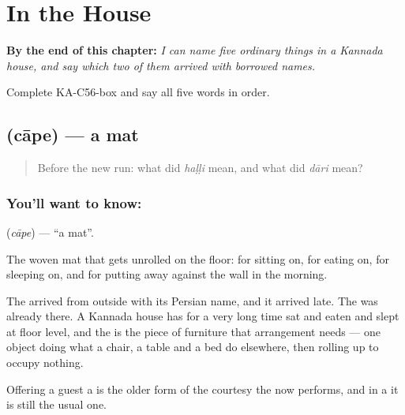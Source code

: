 
\chapter{In the House}
\label{ch:ka-house}

\begin{chapteropening}
\textbf{By the end of this chapter:} \emph{I can name five ordinary things in a Kannada house, and say which two of them arrived with borrowed names.}

Complete KA-C56-box and say all five words in order.
\end{chapteropening}

\section[\texorpdfstring{\kn{ಚಾಪೆ} (cāpe)}{ಚಾಪೆ (cāpe)}]{ (cāpe) — a mat}

\label{lesson:KA-C56-mat}



\begin{quote}
Before the new run: what did \emph{haḷḷi} mean, and what did \emph{dāri} mean?
\end{quote}

\subsection*{You'll want to know: }
\textbf{} (\emph{cāpe}) — \textquotedblleft{}a mat\textquotedblright{}.

The woven mat that gets unrolled on the floor: for sitting on, for eating on, for sleeping on, and for putting away against the wall in the morning.

The  arrived from outside with its Persian name, and it arrived late. The  was already there. A Kannada house has for a very long time sat and eaten and slept at floor level, and the  is the piece of furniture that arrangement needs — one object doing what a chair, a table and a bed do elsewhere, then rolling up to occupy nothing.

Offering a guest a  is the older form of the courtesy the  now performs, and in a  it is still the usual one.

